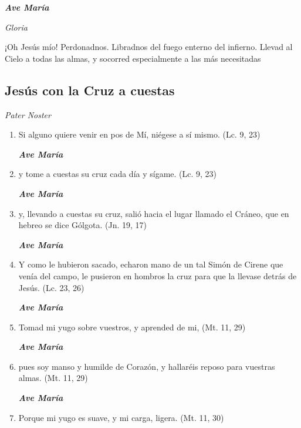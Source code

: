 \documentclass[a4paper,11pt, oneside]{report}
\begin{document}
      \textbf{\textit{Ave María}} \par
      \indent\textit{Gloria} \par
      \indent¡Oh Jesús mío! Perdonadnos. Libradnos del fuego enterno del infierno. Llevad al Cielo a todas las almas, y socorred especialmente a las más 
      necesitadas

    \subsection*{ Jesús con la Cruz a cuestas }
      
      \textit{Pater Noster}

      \begin{enumerate}
        
        \item Si alguno quiere venir en pos de Mí, niégese a sí mismo. (Lc. 9, 23)

        \textbf{\textit{Ave María}}

        \item y tome a cuestas su cruz cada día y sígame. (Lc. 9, 23)

        \textbf{\textit{Ave María}}

        \item y, llevando a cuestas su cruz, salió hacia el lugar llamado el Cráneo, que en hebreo se dice Gólgota. (Jn. 19, 17)

        \textbf{\textit{Ave María}}

        \item Y como le hubieron sacado, echaron mano de un tal Simón de Cirene que venía del campo, le pusieron en hombros la cruz para que la llevase
        detrás de Jesús. (Lc. 23, 26)

        \textbf{\textit{Ave María}}

        \item Tomad mi yugo sobre vuestros, y aprended de mi, (Mt. 11, 29)

        \textbf{\textit{Ave María}}

        \item pues soy manso y humilde de Corazón, y hallaréis reposo para vuestras almas. (Mt. 11, 29)

        \textbf{\textit{Ave María}}

        \item Porque mi yugo es suave, y mi carga, ligera. (Mt. 11, 30)


\end{enumerate}
\end{document}
